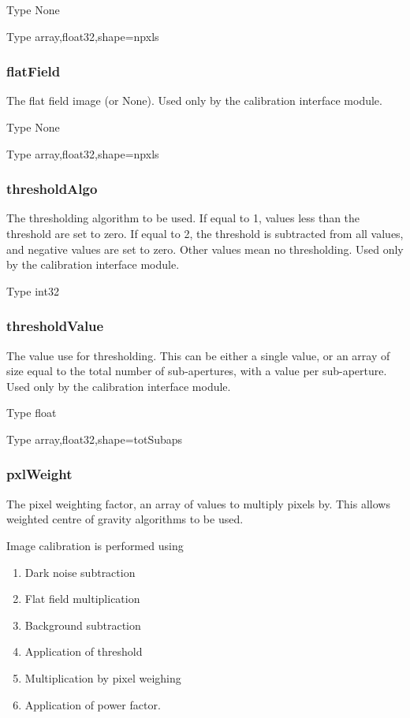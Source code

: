 \documentclass[a4,10pt]{article}
\begin{document}
Type None

Type array,float32,shape=npxls

\subsubsection{flatField}
The flat field image (or None).  Used only by the calibration interface module.

Type None

Type array,float32,shape=npxls

\subsubsection{thresholdAlgo}
The thresholding algorithm to be used.  If equal to 1, 
values less than the threshold are set to zero.  If equal to 2, the
threshold is subtracted from all values, and negative values are set
to zero.  Other values mean no thresholding.  Used only by the calibration interface module.

Type int32

\subsubsection{thresholdValue}
The value use for thresholding.  This can be either a single value, or
an array of size equal to the total number of sub-apertures, with a
value per sub-aperture.  Used only by the calibration interface
module.

Type float

Type array,float32,shape=totSubaps

\subsubsection{pxlWeight}
The pixel weighting factor, an array of values to multiply pixels by.
This allows weighted centre of gravity algorithms to be used.

Image calibration is performed using
\begin{enumerate}
\item Dark noise subtraction
\item Flat field multiplication
\item Background subtraction
\item Application of threshold
\item Multiplication by pixel weighing
\item Application of power factor.
\end{enumerate}
\end{document}
